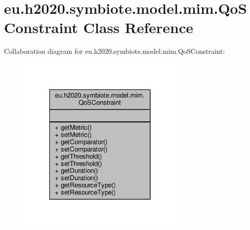 \hypertarget{classeu_1_1h2020_1_1symbiote_1_1model_1_1mim_1_1QoSConstraint}{}\section{eu.\+h2020.\+symbiote.\+model.\+mim.\+Qo\+S\+Constraint Class Reference}
\label{classeu_1_1h2020_1_1symbiote_1_1model_1_1mim_1_1QoSConstraint}


Collaboration diagram for eu.\+h2020.\+symbiote.\+model.\+mim.\+Qo\+S\+Constraint\+:
\nopagebreak
\begin{figure}[H]
\begin{center}
\leavevmode
\includegraphics[width=232pt]{classeu_1_1h2020_1_1symbiote_1_1model_1_1mim_1_1QoSConstraint__coll__graph}
\end{center}
\end{figure}

